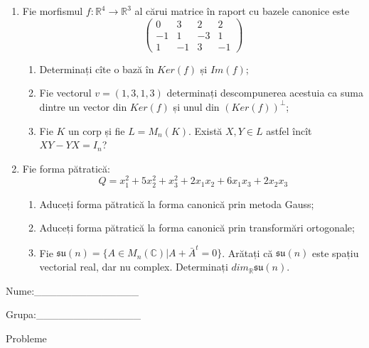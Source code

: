 \documentclass{article}
\begin{document}
\begin{enumerate}
 \item Fie morfismul $f:\mathbb{R}^4 \to \mathbb{R}^3$ al cărui matrice în raport cu bazele canonice este
$$\begin{pmatrix}
0&3&2&2\\
-1&1&-3&1\\
1&-1&3&-1
\end{pmatrix}$$

\begin{enumerate}
\item Determinați cîte o bază în $Ker(f)$ și $Im(f)$;
\item Fie vectorul $v=(1,3,1,3)$ determinați descompunerea acestuia ca suma dintre un vector din $Ker(f)$ și unul din $(Ker(f))^\perp$;
\item Fie $K$ un corp și fie $L=M_n(K)$. Există $X,Y \in L$ astfel încît $XY-YX=I_n$?  
\end{enumerate}
\item Fie forma pătratică:
$$Q= x_1^2+5x_2^2+x_3^2+2x_1x_2+6x_1x_3+2x_2x_3$$

\begin{enumerate}
\item Aduceți forma pătratică la forma canonică prin metoda Gauss;
\item Aduceți forma pătratică la forma canonică prin transformări ortogonale;
\item Fie $\mathfrak{su}(n)=\{ A \in M_n(\mathbb{C}) | A+\bar{A}^t=0\}$. Arătați că $\mathfrak{su}(n)$ este spațiu vectorial real, dar nu complex.
Determinați $dim_{\mathbb{R}}\mathfrak{su}(n)$.
\end{enumerate}
\end{enumerate}
\newpage
\begin{flushright}
Nume:\_\_\_\_\_\_\_\_\_\_\_\_\_\_
 
 
Grupa:\_\_\_\_\_\_\_\_\_\_\_\_\_\_
\end{flushright}
\begin{center}
\vspace{2cm}
{\Large Probleme}
\vspace{2cm}
\end{center}
\end{document}
